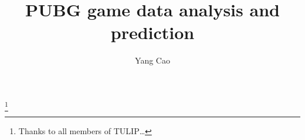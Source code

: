 \documentclass{amsart}
\begin{document}
%
%
\title[PUBG analysis,prediction]{PUBG game data analysis and prediction}%


\author{Yang Cao}
\address[A.~2]{School of Information Technology \\
Deakin University, Geelong, VIC 3216, Australia}%



\thanks{Thanks to all members of TULIP\ldots}%
%
\date{\gitAuthorDate}%




\maketitle
\tableofcontents

\newpage



\newpage



\listoftodos
\end{document}
